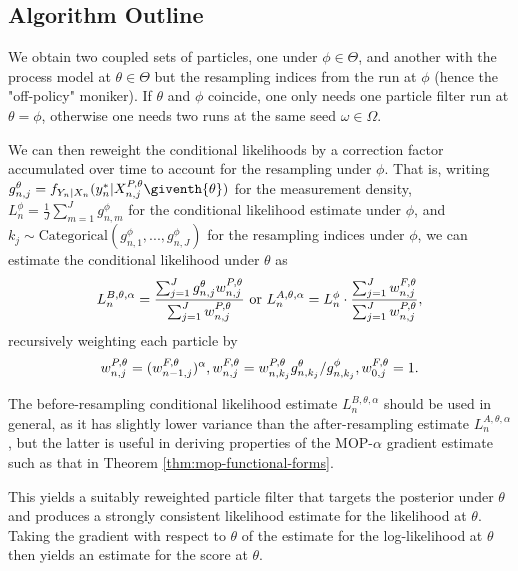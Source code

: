 \documentclass[9pt,twocolumn,twoside]{pnas-new}
\begin{document}
\subsection{Algorithm Outline} 
We obtain two coupled sets of particles, one under $\phi \in \Theta$, and another with the process model at $\theta \in \Theta$ but the resampling indices from the run at $\phi$ (hence the "off-policy" moniker). If $\theta$ and $\phi$ coincide, one only needs one particle filter run at $\theta=\phi$, otherwise one needs two runs at the same seed $\omega \in \Omega$.

We can then reweight the conditional likelihoods by a correction factor accumulated over time to account for the resampling under $\phi$. That is, writing $g^{\theta}_{n,j}={f}_{{Y}_{n}|{X}_{n}}(y_{n}^{*}|{X}_{n,j}^{P,\theta}\giventh{\theta})$ for the measurement density, $L_n^{\phi} = \frac{1}{J}\sum_{m=1}^{J}g^{\phi}_{n,m}$ for the conditional likelihood estimate under $\phi$, and $k_j \sim \text{Categorical}(g^{\phi}_{n,1},...,g^{\phi}_{n,J})$ for the resampling indices under $\phi$, we can estimate the conditional likelihood under $\theta$ as
\vspace*{-2.5mm}
\begin{equation}
     \label{eq:mop-conditional-likelihood}
     L_n^{B,\theta,\alpha} = \frac{\sum_{j=1}^Jg^\theta_{n,j} w^{P,\theta}_{n,j}}{\sum_{j=1}^J  w^{P,\theta}_{n,j}} \text{ or } L_n^{A,\theta,\alpha} = L_n^\phi\cdot \frac{\sum_{j=1}^J w^{F,\theta}_{n,j}}{\sum_{j=1}^J  w^{P,\theta}_{n,j}},
     \vspace*{-2.5mm}
\end{equation}
recursively weighting each particle by 
\vspace*{-2.5mm}
\begin{equation}
    \label{eq:weighting-scheme}
    w_{n,j}^{P,\theta} = (w_{n-1,j}^{F,\theta})^\alpha,  w^{F,\theta}_{n,j} = w^{P,\theta}_{n,k_j} { g^{\theta}_{n,k_j}}/{ g^{\phi}_{n,k_j}}, w^{F,\theta}_{0,j}= 1.
    \vspace*{-2.5mm}
\end{equation}

The before-resampling conditional likelihood estimate $L_n^{B,\theta,\alpha}$ should be used in general, as it has slightly lower variance than the after-resampling estimate $L_n^{A,\theta,\alpha}$, but the latter is useful in deriving properties of the MOP-$\alpha$ gradient estimate such as that in Theorem \ref{thm:mop-functional-forms}.

This yields a suitably reweighted particle filter that targets the posterior under $\theta$ and produces a strongly consistent likelihood estimate for the likelihood at $\theta$. Taking the gradient with respect to $\theta$ of the estimate for the log-likelihood at $\theta$ then yields an estimate for the score at $\theta$. 
\end{document}
